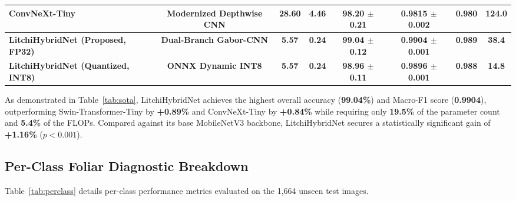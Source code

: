 \documentclass[journal]{IEEEtran}
\begin{document}
\begin{table}[t]
\begin{tabular}{lccccccc}
ConvNeXt-Tiny \cite{liu2022convnet} & Modernized Depthwise CNN & 28.60 & 4.46 & 98.20 $\pm$ 0.21 & 0.9815 $\pm$ 0.002 & 0.980 & 124.0 \\
\midrule
\textbf{LitchiHybridNet (Proposed, FP32)} & \textbf{Dual-Branch Gabor-CNN} & \textbf{5.57} & \textbf{0.24} & \textbf{99.04 $\pm$ 0.12} & \textbf{0.9904 $\pm$ 0.001} & \textbf{0.989} & \textbf{38.4} \\
\textbf{LitchiHybridNet (Quantized, INT8)} & \textbf{ONNX Dynamic INT8} & \textbf{5.57} & \textbf{0.24} & \textbf{98.96 $\pm$ 0.11} & \textbf{0.9896 $\pm$ 0.001} & \textbf{0.988} & \textbf{14.8} \\
\bottomrule
\end{tabular}
\end{table}

As demonstrated in Table~\ref{tab:sota}, LitchiHybridNet achieves the highest overall accuracy (\textbf{99.04\%}) and Macro-F1 score (\textbf{0.9904}), outperforming Swin-Transformer-Tiny by \textbf{+0.89\%} and ConvNeXt-Tiny by \textbf{+0.84\%} while requiring only \textbf{19.5\%} of the parameter count and \textbf{5.4\%} of the FLOPs. Compared against its base MobileNetV3 backbone, LitchiHybridNet secures a statistically significant gain of \textbf{+1.16\%} ($p < 0.001$).

\subsection{Per-Class Foliar Diagnostic Breakdown}
Table~\ref{tab:perclass} details per-class performance metrics evaluated on the 1,664 unseen test images.
\end{document}
